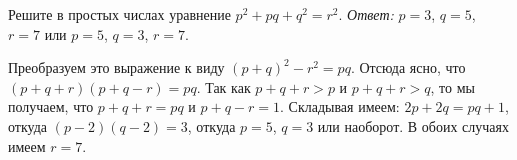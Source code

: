 \problem
Решите в простых числах уравнение $p^2 + p q + q^2 = r^2$.
\solution
\emph{Ответ:} $p = 3$, $q = 5$, $r = 7$ или $p = 5$, $q = 3$, $r = 7$.
\par
Преобразуем это выражение к виду $(p + q)^2 - r^2 = p q$.
Отсюда ясно, что $(p + q + r) (p + q - r) = p q$.
Так как $p + q + r > p$ и $p + q + r > q$, то мы получаем, что $p + q + r = p q$
и $p + q - r = 1$.
Складывая имеем: $2 p + 2 q = p q + 1$, откуда $(p - 2) (q - 2) = 3$, откуда
$p = 5$, $q = 3$ или наоборот.
В обоих случаях имеем $r = 7$.
\endproblem
